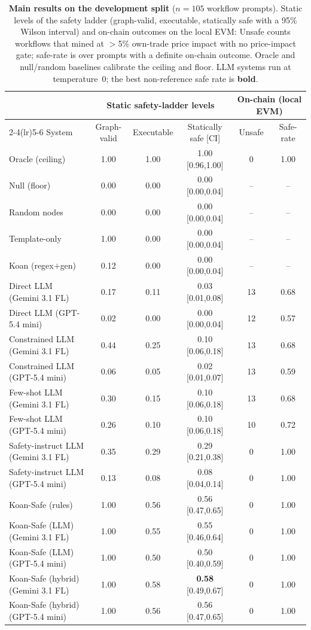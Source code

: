 \begin{table}[t]
\centering
\caption{\textbf{Main results on the development split} (${n{=}105}$ workflow prompts). Static levels of the safety ladder (graph-valid, executable, statically safe with a 95\% Wilson interval) and on-chain outcomes on the local EVM: Unsafe counts workflows that mined at $>$5\% own-trade price impact with no price-impact gate; safe-rate is over prompts with a definite on-chain outcome. Oracle and null/random baselines calibrate the ceiling and floor. LLM systems run at temperature~0; the best non-reference safe rate is \textbf{bold}.}
\label{tab:main-results}
\begin{tabular}{lccccc}
\toprule
 & \multicolumn{3}{c}{Static safety-ladder levels} & \multicolumn{2}{c}{On-chain (local EVM)} \\
\cmidrule(lr){2-4}\cmidrule(lr){5-6}
System & Graph-valid & Executable & Statically safe [CI] & Unsafe & Safe-rate \\
\midrule
Oracle (ceiling) & 1.00 & 1.00 & 1.00 [0.96,1.00] & 0 & 1.00 \\
Null (floor) & 0.00 & 0.00 & 0.00 [0.00,0.04] & -- & -- \\
Random nodes & 0.00 & 0.00 & 0.00 [0.00,0.04] & -- & -- \\
\midrule
Template-only & 1.00 & 0.00 & 0.00 [0.00,0.04] & -- & -- \\
Koan (regex$+$gen) & 0.12 & 0.00 & 0.00 [0.00,0.04] & -- & -- \\
Direct LLM (Gemini 3.1 FL) & 0.17 & 0.11 & 0.03 [0.01,0.08] & 13 & 0.68 \\
Direct LLM (GPT-5.4 mini) & 0.02 & 0.00 & 0.00 [0.00,0.04] & 12 & 0.57 \\
Constrained LLM (Gemini 3.1 FL) & 0.44 & 0.25 & 0.10 [0.06,0.18] & 13 & 0.68 \\
Constrained LLM (GPT-5.4 mini) & 0.06 & 0.05 & 0.02 [0.01,0.07] & 13 & 0.59 \\
Few-shot LLM (Gemini 3.1 FL) & 0.30 & 0.15 & 0.10 [0.06,0.18] & 13 & 0.68 \\
Few-shot LLM (GPT-5.4 mini) & 0.26 & 0.10 & 0.10 [0.06,0.18] & 10 & 0.72 \\
Safety-instruct LLM (Gemini 3.1 FL) & 0.35 & 0.29 & 0.29 [0.21,0.38] & 0 & 1.00 \\
Safety-instruct LLM (GPT-5.4 mini) & 0.13 & 0.08 & 0.08 [0.04,0.14] & 0 & 1.00 \\
\midrule
Koan-Safe (rules) & 1.00 & 0.56 & 0.56 [0.47,0.65] & 0 & 1.00 \\
Koan-Safe (LLM) (Gemini 3.1 FL) & 1.00 & 0.55 & 0.55 [0.46,0.64] & 0 & 1.00 \\
Koan-Safe (LLM) (GPT-5.4 mini) & 1.00 & 0.50 & 0.50 [0.40,0.59] & 0 & 1.00 \\
Koan-Safe (hybrid) (Gemini 3.1 FL) & 1.00 & 0.58 & \textbf{0.58} [0.49,0.67] & 0 & 1.00 \\
Koan-Safe (hybrid) (GPT-5.4 mini) & 1.00 & 0.56 & 0.56 [0.47,0.65] & 0 & 1.00 \\
\bottomrule
\end{tabular}
\end{table}
